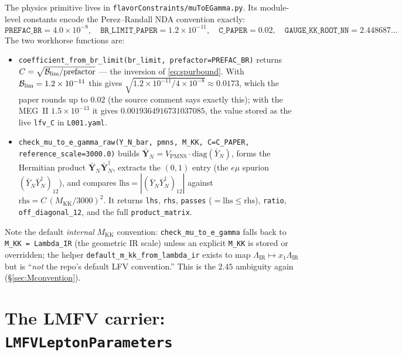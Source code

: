 \documentclass[11pt]{article}
\newcommand{\MKK}{M_{\mathrm{KK}}}
\newcommand{\LIR}{\Lambda_{\mathrm{IR}}}
\newcommand{\YNb}{\bar Y_N}
\newcommand{\YNbmat}{\bar{\mathbf{Y}}_N}
\newcommand{\spur}{(\YNb\YNb^\dagger)_{12}}
\newcommand{\BR}{\mathcal{B}}
\newcommand{\Vpmns}{V_{\mathrm{PMNS}}}
\newcommand{\code}[1]{\texttt{#1}}
\theoremstyle{definition}
\begin{document}
The physics primitive lives in \code{flavorConstraints/muToEGamma.py}. Its
module-level constants encode the Perez--Randall NDA convention exactly:
\begin{equation}
\code{PREFAC\_BR} = 4.0\times10^{-8},\quad
\code{BR\_LIMIT\_PAPER} = 1.2\times10^{-11},\quad
\code{C\_PAPER} = 0.02,\quad
\code{GAUGE\_KK\_ROOT\_NN} = 2.448687\ldots
\end{equation}
The two workhorse functions are:
\begin{itemize}[leftmargin=1.4em]
\item \code{coefficient\_from\_br\_limit(br\_limit, prefactor=PREFAC\_BR)} returns
$C=\sqrt{\BR_{\rm lim}/\text{prefactor}}$ --- the inversion of
\eqref{eq:spurbound}. With $\BR_{\rm lim}=1.2\times10^{-11}$ this gives
$\sqrt{1.2\times10^{-11}/4\times10^{-8}}\approx 0.0173$, which the paper rounds up
to $0.02$ (the source comment says exactly this); with the MEG~II
$1.5\times10^{-13}$ it gives $0.0019364916731037085$, the value stored as the
live \code{lfv\_C} in \code{L001.yaml}.
\item \code{check\_mu\_to\_e\_gamma\_raw(Y\_N\_bar, pmns, M\_KK, C=C\_PAPER,
reference\_scale=3000.0)} builds $\YNbmat=\Vpmns\cdot\mathrm{diag}(\YNb)$,
forms the Hermitian product $\YNbmat\YNbmat^\dagger$, extracts
the $(0,1)$ entry (the $e\mu$ spurion $\spur$), and compares
$\text{lhs}=|\spur|$ against $\text{rhs}=C\,(\MKK/3000)^2$. It returns
\code{lhs}, \code{rhs}, \code{passes} ($=\text{lhs}\le\text{rhs}$), \code{ratio},
\code{off\_diagonal\_12}, and the full \code{product\_matrix}.
\end{itemize}
Note the default \emph{internal} $\MKK$ convention: \code{check\_mu\_to\_e\_gamma}
falls back to \code{M\_KK = Lambda\_IR} (the geometric IR scale) unless an
explicit \code{M\_KK} is stored or overridden; the helper
\code{default\_m\_kk\_from\_lambda\_ir} exists to map $\LIR\mapsto x_1\LIR$ but is
``\emph{not} the repo's default LFV convention.'' This is the $2.45$ ambiguity
again (\S\ref{sec:Mconvention}).

\section{The LMFV carrier: \code{LMFVLeptonParameters}}
\label{sec:carrier}
\end{document}
